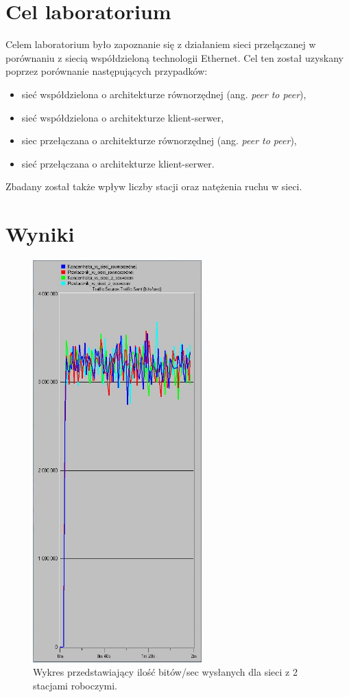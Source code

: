 \documentclass{article}
\begin{document}

\newpage
\section{Cel laboratorium}
Celem laboratorium było zapoznanie się z działaniem sieci przełączanej w porównaniu z siecią współdzieloną technologii Ethernet. Cel ten został uzyskany poprzez porównanie następujących przypadków:
\begin{itemize}
\item sieć współdzielona o architekturze równorzędnej (ang. \textit{peer to peer}),
\item sieć współdzielona o architekturze klient-serwer,
\item siec przełączana o architekturze równorzędnej (ang. \textit{peer to peer}),
\item sieć przełączana o architekturze klient-serwer.
\end{itemize}
Zbadany został także wpływ liczby stacji oraz natężenia ruchu w sieci.
\section{Wyniki}
\begin{figure}[H]
  \centering
  \includegraphics[width=0.58\textwidth]{screens/2_sent.png}
 \caption{Wykres przedstawiający ilość bitów/sec wysłanych dla sieci z 2 stacjami roboczymi.}
 \label{fig:2stacjes}
\end{figure}
\end{document}
